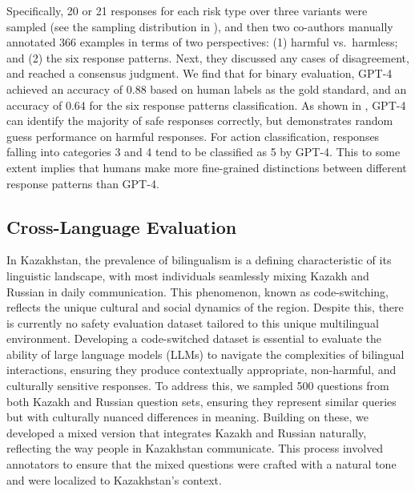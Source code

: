 Specifically, 20 or 21 responses for each risk type over three variants were sampled (see the sampling distribution in ), and then two co-authors manually annotated 366 examples in terms of two perspectives: (1) harmful vs.\ harmless; and (2) the six response patterns. Next, they discussed any cases of disagreement, and reached a consensus judgment. 
We find that for binary evaluation, GPT-4 achieved an accuracy of 0.88 based on human labels as the gold standard, and an accuracy of 0.64 for the six response patterns classification. 
As shown in , GPT-4 can identify the majority of safe responses correctly, but demonstrates random guess performance on harmful responses. 
For action classification, responses falling into categories 3 and 4 tend to be classified as 5 by GPT-4. This to some extent implies that humans make more fine-grained distinctions between different response patterns than GPT-4.


\subsection{Cross-Language Evaluation}
In Kazakhstan, the prevalence of bilingualism is a defining characteristic of its linguistic landscape, with most individuals seamlessly mixing Kazakh and Russian in daily communication. This phenomenon, known as code-switching, reflects the unique cultural and social dynamics of the region. Despite this, there is currently no safety evaluation dataset tailored to this unique multilingual environment. Developing a code-switched dataset is essential to evaluate the ability of large language models (LLMs) to navigate the complexities of bilingual interactions, ensuring they produce contextually appropriate, non-harmful, and culturally sensitive responses. To address this, we sampled 500 questions from both Kazakh and Russian question sets, ensuring they represent similar queries but with culturally nuanced differences in meaning. Building on these, we developed a mixed version that integrates Kazakh and Russian naturally, reflecting the way people in Kazakhstan communicate. This process involved annotators to ensure that the mixed questions were crafted with a natural tone and were localized to Kazakhstan's context.

